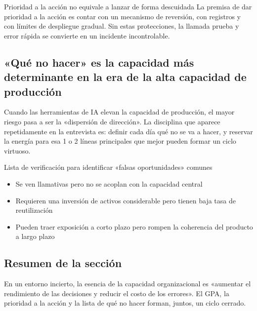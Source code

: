 \begin{warningbox}{Prioridad a la acción no equivale a lanzar de forma descuidada}
La premisa de dar prioridad a la acción es contar con un mecanismo de reversión, con registros y con límites de despliegue gradual. Sin estas protecciones, la llamada prueba y error rápida se convierte en un incidente incontrolable.
\end{warningbox}

\subsection{«Qué no hacer» es la capacidad más determinante en la era de la alta capacidad de producción}

Cuando las herramientas de IA elevan la capacidad de producción, el mayor riesgo pasa a ser la «dispersión de dirección». La disciplina que aparece repetidamente en la entrevista es: definir cada día qué no se va a hacer, y reservar la energía para esa 1 o 2 líneas principales que mejor pueden formar un ciclo virtuoso.

\begin{knowledgebox}{Lista de verificación para identificar «falsas oportunidades» comunes}
\begin{itemize}
    \item Se ven llamativas pero no se acoplan con la capacidad central
    \item Requieren una inversión de activos considerable pero tienen baja tasa de reutilización
    \item Pueden traer exposición a corto plazo pero rompen la coherencia del producto a largo plazo
\end{itemize}
\end{knowledgebox}

\subsection{Resumen de la sección}

En un entorno incierto, la esencia de la capacidad organizacional es «aumentar el rendimiento de las decisiones y reducir el costo de los errores». El GPA, la prioridad a la acción y la lista de qué no hacer forman, juntos, un ciclo cerrado.

